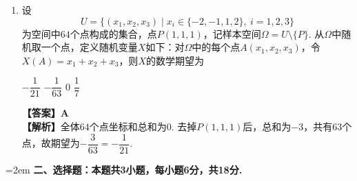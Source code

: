 \documentclass[12pt,a4paper]{article}
\begin{document}
\begin{enumerate}[leftmargin=*,label=\arabic*.,itemsep=0.8ex]
		\item 设
		\[
		U=\{(x_1,x_2,x_3)\mid x_i\in\{-2,-1,1,2\},\ i=1,2,3\}
		\]
		为空间中$64$个点构成的集合，点$P(1,1,1)$，记样本空间$\Omega=U\setminus\{P\}$. 从$\Omega$中随机取一个点，定义随机变量$X$如下：对$\Omega$中的每个点$A(x_1,x_2,x_3)$，令$X(A)=x_1+x_2+x_3$，则$X$的数学期望为
		\begin{choicesFour}
			\choice $-\dfrac1{21}$ \choice $-\dfrac1{63}$ \choice $0$ \choice $\dfrac17$
		\end{choicesFour}
		\textbf{【答案】A}\\
		\textbf{【解析】}全体$64$个点坐标和总和为$0$. 去掉$P(1,1,1)$后，总和为$-3$，共有$63$个点，故期望为$-\dfrac3{63}=-\dfrac1{21}$.
		
	\end{enumerate}
	
	\vspace{0.3cm}
	
	\noindent\hangindent=2em {\bfseries 二、选择题：本题共3小题，每小题6分，共18分.}
	
\end{document}
